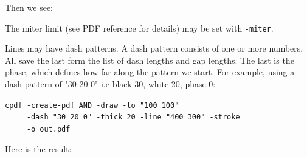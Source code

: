 \documentclass{book}
\begin{document}
\noindent Then we see:

\bigskip
{}
\bigskip

\noindent The miter limit (see PDF reference for details) may be set with \texttt{-miter}.

Lines may have dash patterns. A dash pattern consists of one or more numbers. All save the last form the list of dash lengths and gap lengths. The last is the phase, which defines how far along the pattern we start. For example, using a dash pattern of "30 20 0" i.e black 30, white 20, phase 0:

\begin{framed}
 \noindent\small\verb?cpdf -create-pdf AND -draw -to "100 100"?\\
 \noindent\small\verb?     -dash "30 20 0" -thick 20 -line "400 300" -stroke?\\
 \noindent\small\verb?     -o out.pdf?
\end{framed}

\noindent Here is the result:

\bigskip
{}
\bigskip
\end{document}
